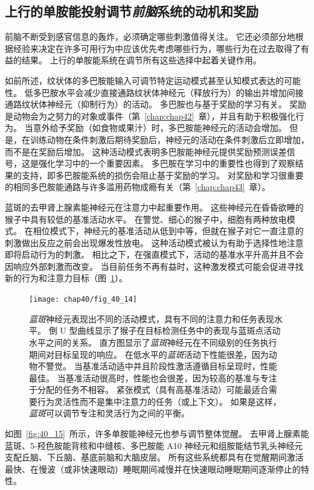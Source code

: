 \subsection{上行的单胺能投射调节\textit{前脑}系统的动机和奖励}

前脑不断受到感官信息的轰炸，必须确定哪些刺激值得关注。
它还必须部分地根据经验来决定在许多可用行为中应该优先考虑哪些行为，哪些行为在过去取得了有益的结果。
上行的单胺能系统在调节所有这些选择中起着关键作用。


如前所述，纹状体的多巴胺能输入可调节特定运动模式甚至认知模式表达的可能性。
低多巴胺水平会减少直接通路纹状体神经元（释放行为）的输出并增加间接通路纹状体神经元（抑制行为）的活动。
多巴胺也与基于奖励的学习有关。
奖励是动物会为之努力的对象或事件（第~\ref{chap:chap42}~章），并且有助于积极强化行为。
当意外给予奖励（如食物或果汁）时，多巴胺能神经元的活动会增加。
但是，在训练动物在条件刺激后期待奖励后，神经元的活动在条件刺激后立即增加，而不是在奖励后增加。
这种活动模式表明多巴胺能神经元提供奖励预测误差信号，这是强化学习中的一个重要因素。
多巴胺在学习中的重要性也得到了观察结果的支持，即多巴胺能系统的损伤会阻止基于奖励的学习。
对奖励和学习很重要的相同多巴胺能通路与许多滥用药物成瘾有关（第~\ref{chap:chap43}~章）。


蓝斑的去甲肾上腺素能神经元在注意力中起重要作用。
这些神经元在昏昏欲睡的猴子中具有较低的基准活动水平。
在警觉、细心的猴子中，细胞有两种放电模式。
在相位模式下，神经元的基准活动从低到中等，但就在猴子对它一直注意的刺激做出反应之前会出现爆发性放电。
这种活动模式被认为有助于选择性地注意即将启动行为的刺激。
相比之下，在强直模式下，活动的基准水平升高并且不会因响应外部刺激而改变。
当目前任务不再有益时，这种激发模式可能会促进寻找新的行为和注意力目标（图~\ref{fig:40_14}）。


\begin{figure}[htbp]
	\centering
	\texttt{[image: chap40/fig\_40\_14]}
	\caption{\textit{蓝斑}神经元表现出不同的活动模式，具有不同的注意力和任务表现水平。
		倒 U 型曲线显示了猴子在目标检测任务中的表现与蓝斑点活动水平之间的关系。
		直方图显示了\textit{蓝斑}神经元在不同级别的任务执行期间对目标呈现的响应。
		在低水平的\textit{蓝斑}活动下性能很差，因为动物不警觉。
		当基准活动适中并且阶段性激活遵循目标呈现时，性能最佳。
		当基准活动很高时，性能也会很差，因为较高的基准与专注于分配的任务不相容。
		紧张模式（具有高基准活动）可能最适合需要行为灵活性而不是集中注意力的任务（或上下文）。
		如果是这样，\textit{蓝斑}可以调节专注和灵活行为之间的平衡\cite{aston1999role}。}
	\label{fig:40_14}
\end{figure}


如图~\ref{fig:40_15}~所示，许多单胺能神经元也参与调节整体觉醒。
去甲肾上腺素能蓝斑、5-羟色胺能背核和中缝核、多巴胺能 A10 神经元和组胺能结节乳头神经元支配丘脑、下丘脑、基底前脑和大脑皮层。
所有这些系统都具有在觉醒期间激活最快、在慢波（或非快速眼动）睡眠期间减慢并在快速眼动睡眠期间逐渐停止的特性。


